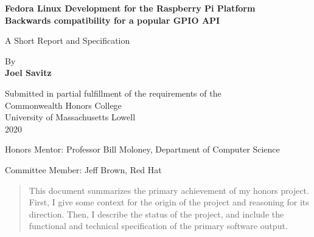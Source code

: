 \documentclass{article}
\author{Joel Savitz}
\begin{document}
\begin{titlepage}
   \begin{center}
       \vspace*{1cm}

	\textbf{Fedora Linux Development for the Raspberry Pi Platform \\
		\small Backwards compatibility for a popular GPIO API}

       \vspace{0.5cm}
        A Short Report and Specification
            
       \vspace{1.5cm}

       By \\
       \textbf{Joel Savitz}

       \vfill
            
       Submitted in partial fulfillment
       of the requirements of the \\
       Commonwealth Honors College \\
       University of Massachusetts Lowell \\
       2020
            
       \vspace{0.8cm}
     
            
       Honors Mentor: Professor Bill Moloney, Department of Computer Science

       Committee Member: Jeff Brown, Red Hat


            
   \end{center}
\end{titlepage}

\begin{abstract}

This document summarizes
the primary achievement
of my honors project.
First, I give some context
for the origin of the project
and reasoning for its direction.
Then, I describe the status of the project,
and include the functional and technical specification
of the primary software output.

\end{abstract}
\end{document}
